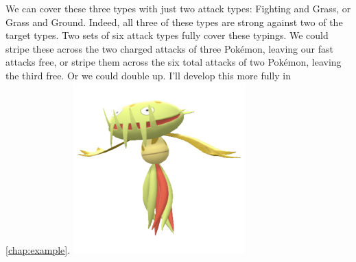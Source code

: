 We can cover these three types with just two attack types: Fighting and Grass, or Grass and Ground.
Indeed, all three of these types are strong against two of the target types.
Two sets of six attack types fully cover these typings.
We could stripe these across the two charged attacks of three Pokémon,
  leaving our fast attacks free, or stripe them across the six total
  attacks of two Pokémon, leaving the third free.
Or we could double up.
I'll develop this more fully in \autoref{chap:example}.
\vfill\includegraphics[width=\linewidth,keepaspectratio]{images/carnivine.png}

